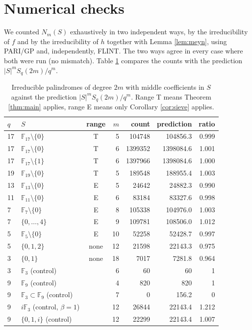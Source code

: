 \documentclass[11pt]{amsart}
\theoremstyle{definition}
\newcommand{\F}{\mathbb{F}}
\begin{document}
\section{Numerical checks}

We counted $N_m(S)$ exhaustively in two independent ways, by the irreducibility of $f$ and by the irreducibility of $h$ together with Lemma \ref{lem:meyn}, using PARI/GP and, independently, FLINT. The two ways agree in every case where both were run (no mismatch). Table \ref{tab:counts} compares the counts with the prediction $|S|^mS_q(2m)/q^m$.

\begin{table}[ht]
\centering
\caption{Irreducible palindromes of degree $2m$ with middle coefficients in $S$ against the prediction $|S|^mS_q(2m)/q^m$. Range T means Theorem \ref{thm:main} applies, range E means only Corollary \ref{cor:sieve} applies.}\label{tab:counts}
\begin{tabular}{llcrrrr}
\toprule
$q$ & $S$ & range & $m$ & count & prediction & ratio\\
\midrule
17 & $\F_{17}\setminus\{0\}$ & T & 5 & 104748 & 104856.3 & 0.999\\
17 & $\F_{17}\setminus\{0\}$ & T & 6 & 1399352 & 1398084.6 & 1.001\\
17 & $\F_{17}\setminus\{1\}$ & T & 6 & 1397966 & 1398084.6 & 1.000\\
19 & $\F_{19}\setminus\{0\}$ & T & 5 & 189548 & 188955.4 & 1.003\\
13 & $\F_{13}\setminus\{0\}$ & E & 5 & 24642 & 24882.3 & 0.990\\
11 & $\F_{11}\setminus\{0\}$ & E & 6 & 83184 & 83327.6 & 0.998\\
7 & $\F_7\setminus\{0\}$ & E & 8 & 105338 & 104976.0 & 1.003\\
7 & $\{0,\dots,4\}$ & E & 9 & 109781 & 108506.0 & 1.012\\
5 & $\F_5\setminus\{0\}$ & E & 10 & 52258 & 52428.7 & 0.997\\
5 & $\{0,1,2\}$ & none & 12 & 21598 & 22143.3 & 0.975\\
3 & $\{0,1\}$ & none & 18 & 7017 & 7281.8 & 0.964\\
\midrule
3 & $\F_3$ (control) & & 6 & 60 & 60 & 1\\
9 & $\F_9$ (control) & & 4 & 820 & 820 & 1\\
9 & $\F_3\subset\F_9$ (control) & & 7 & 0 & 156.2 & 0\\
9 & $i\F_3$ (control, $\beta=1$) & & 12 & 26844 & 22143.4 & 1.212\\
9 & $\{0,1,i\}$ (control) & & 12 & 22299 & 22143.4 & 1.007\\
\bottomrule
\end{tabular}
\end{table}
\end{document}
